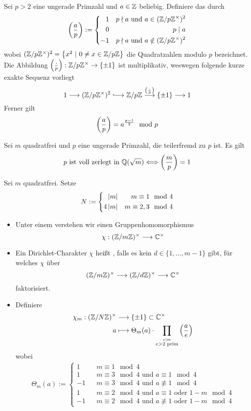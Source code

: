 Sei $p> 2$ eine ungerade Primzahl und $a \in \mathbb{Z}$ beliebig. Definiere das  durch
\[ \left(\frac{a}{p}\right) := \left\lbrace 
\begin{aligned}
1 && p \nmid a \text{ und } a \in (\mathbb{Z}/p\mathbb{Z}^\times)^2\\
0 && p \mid a\\
-1 && p \nmid a \text{ und } a \notin (\mathbb{Z}/p\mathbb{Z}^\times)^2
\end{aligned}
\right. \]
wobei $(\Z/p\Z^\times)^2 = \set{x^2}{0\neq x \in \Z/p\Z}$ die Quadratzahlen modulo $p$ bezeichnet.\\
Die Abbildung $\left(\frac{\cdot}{p}\right) : \mathbb{Z}/p\mathbb{Z}^\times \overset{}{\rightarrow} \{\pm 1\}$ ist multiplikativ, weswegen folgende kurze exakte Sequenz vorliegt
\[ 1 \Pfeil{} (\Z/p\Z^\times)^2 \Inj{} \Z/p\Z \Pfeil{\Leg{\cdot}{p}} \{\pm 1\} \Pfeil{} 1  \]
Ferner gilt
\[ \left(\frac{a}{p}\right) = a^{\frac{p-1}{2}} \mod{p} \]

Sei $m$ quadratfrei und $p$ eine ungerade Primzahl, die teilerfremd zu $p$ ist. Es gilt
\[ p\text{ ist voll zerlegt in }\mathbb{Q}(\sqrt{m}) \overset{}{\Longleftrightarrow} \left(\frac{m}{p}\right) = 1 \]

Sei $m$ quadratfrei. Setze
\begin{align*}
N := 
\left\lbrace\begin{aligned}
\left|m\right| && m \equiv 1 \mod{4}\\
4\left|m\right| && m \equiv 2,3 \mod{4}
\end{aligned}\right.
\end{align*}
\begin{itemize}
\item Unter einem  verstehen wir einen Gruppenhomomorphismus
\[ \chi : (\mathbb{Z} / m\mathbb{Z})^\times \overset{}{\longrightarrow} \mathbb{C}^\times \]
\item Ein Dirichlet-Charakter $\chi$ heißt , falls es kein $d \in \{1,\ldots, m-1\}$ gibt, für welches $\chi$ über
\[ (\mathbb{Z} / m\mathbb{Z})^\times \overset{}{\longrightarrow}(\mathbb{Z} / d\mathbb{Z})^\times \overset{}{\longrightarrow} \mathbb{C}^\times \]
faktorisiert.
\item Definiere
\begin{align*}
\chi_m : (\mathbb{Z} /N\mathbb{Z})^\times  & \overset{}{\longrightarrow} \{\pm 1\} \subset \mathbb{C}^\times\\
a & \longmapsto \Theta_m(a) \cdot \prod_{\stackrel{e|m}{e > 2 \text{ prim}}}\left(\frac{a}{e}\right) 
\end{align*}
wobei
\begin{align*}
\Theta_m(a) := \left\lbrace
\begin{aligned}
1 && m \equiv 1 \mod{4}\\
1 && m \equiv 3 \mod{4} \text{ und } a \equiv 1 \mod{4}\\
-1 && m \equiv 3 \mod{4} \text{ und } a \not\equiv 1 \mod{4}\\
1 && m \equiv 2 \mod{4} \text{ und } a \equiv 1 \text{ oder } 1 - m \mod{4}\\
-1 && m \equiv 2 \mod{4} \text{ und } a \not\equiv 1 \text{ oder } 1 - m \mod{4}
\end{aligned}
\right.
\end{align*}
\end{itemize}


